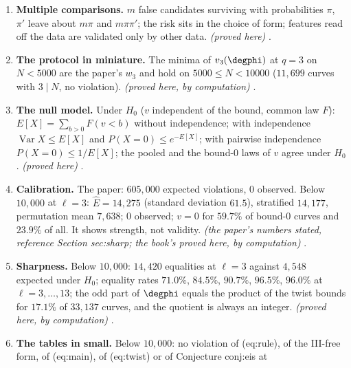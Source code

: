 \begin{enumerate}[label=\textbf{\thechapter.\arabic*}]
extension counts of (eq:main) were known, so confirmed there; the Euler terms confirmed on the hold-out and the extension and independently on the out-of-table
curves, without a strictly blind test; the weights $w_3$, the correction $h_3$ and the III-free
form never blind-tested. \emph{(a reading of the paper's text)}
.
\item \textbf{Multiple comparisons.} $m$ false candidates surviving with probabilities $\pi$, $\pi'$ leave about $m\pi$ and $m\pi\pi'$; the risk sits in the choice of
form; features read off the data are validated only by other data. \emph{(proved here)} .
\item \textbf{The protocol in miniature.} The minima of $v_3(\degphi)$ at $q=3$ on $N<5000$ are the paper's $w_3$ and hold on $5000\le N<10000$ ($11{,}699$ curves with $3\mid N$,
no violation). \emph{(proved here, by computation)} .
\item \textbf{The null model.} Under $H_0$ ($v$ independent of the bound, common law $F$): $E[X]=\sum_{b>0}F(v<b)$ without independence; with independence
$\operatorname{Var}X\le E[X]$ and $P(X=0)\le e^{-E[X]}$; with pairwise independence $P(X=0)\le1/E[X]$; the pooled and the bound-$0$ laws of $v$ agree under $H_0$.
\emph{(proved here)} .
\item \textbf{Calibration.} The paper: $605{,}000$ expected violations, $0$ observed. Below $10{,}000$ at $\ell=3$: $\hat E=14{,}275$ (standard deviation $61.5$), stratified
$14{,}177$, permutation mean $7{,}638$; $0$ observed; $v=0$ for $59.7\%$ of bound-$0$ curves and $23.9\%$ of all. It shows strength, not validity.
\emph{(the paper's numbers stated, reference Section sec:sharp; the book's proved here, by computation)}
.
\item \textbf{Sharpness.} Below $10{,}000$: $14{,}420$ equalities at $\ell=3$ against $4{,}548$ expected under $H_0$; equality rates $71.0\%$, $84.5\%$, $90.7\%$, $96.5\%$, $96.0\%$ at
$\ell=3,\dots,13$; the odd part of $\degphi$ equals the product of the twist bounds for $17.1\%$ of $33{,}137$ curves, and the quotient is always an integer.
\emph{(proved here, by computation)} .
\item \textbf{The tables in small.} Below $10{,}000$: no violation of (eq:rule), of the III-free form, of (eq:main), of (eq:twist) or of Conjecture conj:eis at

\end{enumerate}
